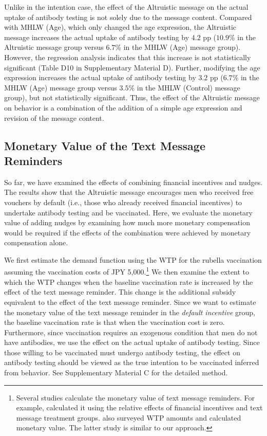 \documentclass[
      12pt,
    a4paper
]{article}
\begin{document}
Unlike in the intention case, the effect of the Altruistic message on the actual uptake of antibody testing is not solely due to the message content. Compared with MHLW (Age), which only changed the age expression, the Altruistic message increases the actual uptake of antibody testing by \(4.2\) pp (\(10.9\)\% in the Altruistic message group versus \(6.7\)\% in the MHLW (Age) message group). However, the regression analysis indicates that this increase is not statistically significant (Table D10 in Supplementary Material D). Further, modifying the age expression increases the actual uptake of antibody testing by \(3.2\) pp (\(6.7\)\% in the MHLW (Age) message group versus \(3.5\)\% in the MHLW (Control) message group), but not statistically significant. Thus, the effect of the Altruistic message on behavior is a combination of the addition of a simple age expression and revision of the message content.

\hypertarget{monetary-value-of-the-text-message-reminders}{%
\subsection{Monetary Value of the Text Message Reminders}\label{monetary-value-of-the-text-message-reminders}}

So far, we have examined the effects of combining financial incentives and nudges. The results show that the Altruistic message encourages men who received free vouchers by default (i.e., those who already received financial incentives) to undertake antibody testing and be vaccinated. Here, we evaluate the monetary value of adding nudges by examining how much more monetary compensation would be required if the effects of the combination were achieved by monetary compensation alone.

We first estimate the demand function using the WTP for the rubella vaccination assuming the vaccination costs of JPY 5,000.\footnote{Several studies calculate the monetary value of text message reminders. For example, \citet{Bursztyn2019} calculated it using the relative effects of financial incentives and text message treatment groups. \citet{Moriwaki2020} also surveyed WTP amounts and calculated monetary value. The latter study is similar to our approach.} We then examine the extent to which the WTP changes when the baseline vaccination rate is increased by the effect of the text message reminder. This change is the additional subsidy equivalent to the effect of the text message reminder. Since we want to estimate the monetary value of the text message reminder in the \emph{default incentive} group, the baseline vaccination rate is that when the vaccination cost is zero. Furthermore, since vaccination requires an exogenous condition that men do not have antibodies, we use the effect on the actual uptake of antibody testing. Since those willing to be vaccinated must undergo antibody testing, the effect on antibody testing should be viewed as the true intention to be vaccinated inferred from behavior. See Supplementary Material C for the detailed method.
\end{document}
